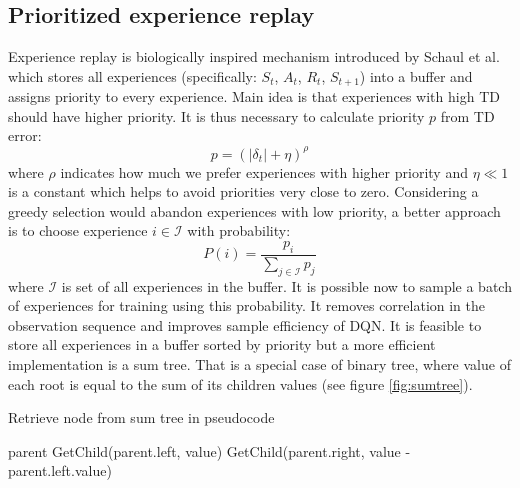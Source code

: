 \clearpage

\subsection{Prioritized experience replay}
Experience replay is biologically inspired mechanism introduced by Schaul et al. \cite{schaul2015} which stores all experiences (specifically: $S_t$, $A_t$, $R_{t}$, $S_{t+1}$) into a buffer and assigns priority to every experience. Main idea is that experiences with high TD should have higher priority. It is thus necessary to calculate priority $p$ from TD error:
\begin{equation}
p = (|\delta_t | + \eta)^\rho
\end{equation}
where $\rho$ indicates how much we prefer experiences with higher priority and $\eta \ll 1$ is a constant which helps to avoid priorities very close to zero. Considering a greedy selection would abandon experiences with low priority, a better approach is to choose experience $i \in \mathcal{I}$ with probability:
\begin{equation}
P(i) = \frac{p_i}{\sum_{j \in \mathcal{I}} p_j}
\end{equation}
where $\mathcal{I}$ is set of all experiences in the buffer. It is possible now to sample a batch of experiences for training using this probability. It removes correlation in the observation sequence and improves sample efficiency of DQN. It is feasible to store all experiences in a buffer sorted by priority but a more efficient implementation is a sum tree. That is a special case of binary tree, where value of each root is equal to the sum of its children values (see figure \ref{fig:sumtree}).
\vspace{5mm}
\begin{algorithm}
\caption{Retrieve node from sum tree in pseudocode}
\begin{algorithmic}[1]
\State \Return parent
\EndIf
{} 
\State \Return GetChild(parent.left, value)
\Else 
\State \Return GetChild(parent.right, value - parent.left.value)
\EndIf
\EndProcedure
\end{algorithmic}
\end{algorithm}
\clearpage
